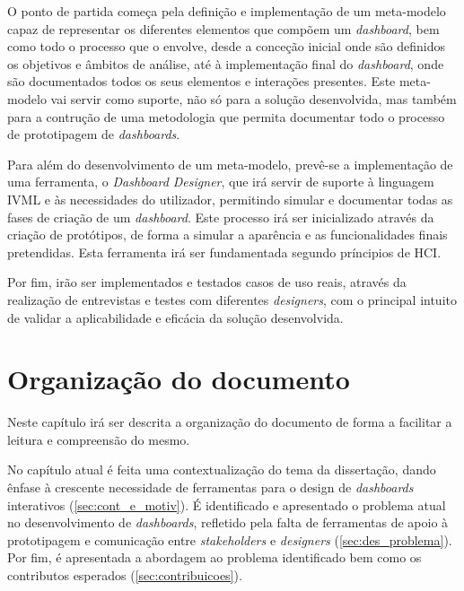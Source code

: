 O ponto de partida começa pela definição e implementação de um meta-modelo capaz de representar os diferentes elementos que compõem um \textit{dashboard}, bem como todo o processo que o envolve, desde a conceção inicial onde são definidos os objetivos e âmbitos de análise, até à implementação final do \textit{dashboard}, onde são documentados todos os seus elementos e interações presentes. Este meta-modelo vai servir como suporte, não só para a solução desenvolvida, mas também para a contrução de uma metodologia que permita documentar todo o processo de prototipagem de \textit{dashboards}.

Para além do desenvolvimento de um meta-modelo, prevê-se a implementação de uma ferramenta, o \textit{Dashboard Designer}, que irá servir de suporte à linguagem \gls{IVML} e às necessidades do utilizador, permitindo simular e documentar todas as fases de criação de um \textit{dashboard}. Este processo irá ser inicializado através da criação de protótipos, de forma a simular a aparência e as funcionalidades finais pretendidas. Esta ferramenta irá ser fundamentada segundo príncipios de \gls{HCI}.

Por fim, irão ser implementados e testados casos de uso reais, através da realização de entrevistas e testes com diferentes \textit{designers}, com o principal intuito de validar a aplicabilidade e eficácia da solução desenvolvida. 

\section{Organização do documento}
\label{sec:organizacao}

Neste capítulo irá ser descrita a organização do documento de forma a facilitar a leitura e compreensão do mesmo. 

No capítulo atual é feita uma contextualização do tema da dissertação, dando ênfase à crescente necessidade de ferramentas para o design de \textit{dashboards} interativos (\ref{sec:cont_e_motiv}). É identificado e apresentado o problema atual no desenvolvimento de \textit{dashboards}, refletido pela falta de ferramentas de apoio à prototipagem e comunicação entre \textit{stakeholders} e \textit{designers} (\ref{sec:des_problema}). Por fim, é apresentada a abordagem ao problema identificado bem como os contributos esperados (\ref{sec:contribuicoes}).

